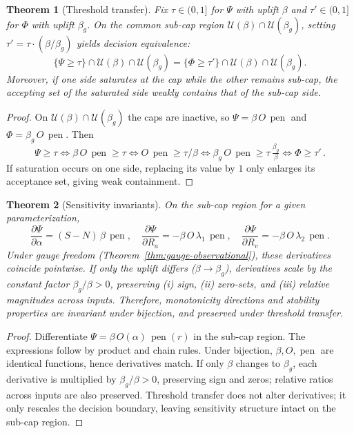 \documentclass[12pt,a4paper]{article}
\newtheorem{theorem}{Theorem}
\begin{document}
\begin{theorem}[Threshold transfer]\label{thm:tt-expanded}
Fix $\tau\in(0,1]$ for $\Psi$ with uplift $\beta$ and $\tau'\in(0,1]$ for $\Phi$ with uplift $\beta_g$. On the common sub-cap region $\mathcal{U}(\beta)\cap\mathcal{U}(\beta_g)$, setting $\tau' = \tau\cdot (\beta/\beta_g)$ yields decision equivalence:
\[
\{\Psi \ge \tau\}\cap\mathcal{U}(\beta)\cap\mathcal{U}(\beta_g) = \{\Phi \ge \tau'\}\cap\mathcal{U}(\beta)\cap\mathcal{U}(\beta_g).
\]
Moreover, if one side saturates at the cap while the other remains sub-cap, the accepting set of the saturated side weakly contains that of the sub-cap side.
\end{theorem}
\begin{proof}
On $\mathcal{U}(\beta)\cap\mathcal{U}(\beta_g)$ the caps are inactive, so $\Psi = \beta\,O\,\operatorname{pen}$ and $\Phi = \beta_g\,O\,\operatorname{pen}$. Then
\[
\Psi \ge \tau \iff \beta\,O\,\operatorname{pen} \ge \tau \iff O\,\operatorname{pen} \ge \tau/\beta \iff \beta_g\,O\,\operatorname{pen} \ge \tau\,\tfrac{\beta_g}{\beta} \iff \Phi \ge \tau'\,.
\]
If saturation occurs on one side, replacing its value by $1$ only enlarges its acceptance set, giving weak containment.
\end{proof}

\begin{theorem}[Sensitivity invariants]\label{thm:sensitivity-invariants}
On the sub-cap region for a given parameterization,
\[
\frac{\partial \Psi}{\partial \alpha} = (S-N)\,\beta\,\operatorname{pen},\quad
\frac{\partial \Psi}{\partial R_a} = -\beta\,O\,\lambda_1\,\operatorname{pen},\quad
\frac{\partial \Psi}{\partial R_v} = -\beta\,O\,\lambda_2\,\operatorname{pen}.
\]
Under gauge freedom (Theorem~\ref{thm:gauge-observational}), these derivatives coincide pointwise. If only the uplift differs ($\beta\to\beta_g$), derivatives scale by the constant factor $\beta_g/\beta>0$, preserving (i) sign, (ii) zero-sets, and (iii) relative magnitudes across inputs. Therefore, monotonicity directions and stability properties are invariant under bijection, and preserved under threshold transfer.
\end{theorem}
\begin{proof}
Differentiate $\Psi = \beta\,O(\alpha)\,\operatorname{pen}(r)$ in the sub-cap region. The expressions follow by product and chain rules. Under bijection, $\beta,O,\operatorname{pen}$ are identical functions, hence derivatives match. If only $\beta$ changes to $\beta_g$, each derivative is multiplied by $\beta_g/\beta>0$, preserving sign and zeros; relative ratios across inputs are also preserved. Threshold transfer does not alter derivatives; it only rescales the decision boundary, leaving sensitivity structure intact on the sub-cap region.
\end{proof}
\end{document}
